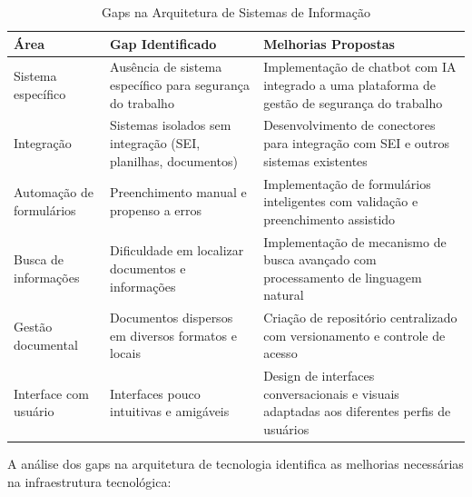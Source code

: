 \documentclass[12pt,a4paper]{article}
\begin{document}
\begin{table}[h]
\centering
\begin{tcolorbox}[enhanced, colback=white, colframe=gray!40, arc=3mm, boxrule=0.5pt]
\scriptsize
\begin{tabular}{|p{2.5cm}|p{4cm}|p{5cm}|}
\hline
\rowcolor{gray!20}
\textbf{Área} & \textbf{Gap Identificado} & \textbf{Melhorias Propostas} \\
\hline
Sistema específico & Ausência de sistema específico para segurança do trabalho & Implementação de chatbot com IA integrado a uma plataforma de gestão de segurança do trabalho \\
\hline
Integração & Sistemas isolados sem integração (SEI, planilhas, documentos) & Desenvolvimento de conectores para integração com SEI e outros sistemas existentes \\
\hline
Automação de formulários & Preenchimento manual e propenso a erros & Implementação de formulários inteligentes com validação e preenchimento assistido \\
\hline
Busca de informações & Dificuldade em localizar documentos e informações & Implementação de mecanismo de busca avançado com processamento de linguagem natural \\
\hline
Gestão documental & Documentos dispersos em diversos formatos e locais & Criação de repositório centralizado com versionamento e controle de acesso \\
\hline
Interface com usuário & Interfaces pouco intuitivas e amigáveis & Design de interfaces conversacionais e visuais adaptadas aos diferentes perfis de usuários \\
\hline
\end{tabular}
\end{tcolorbox}
\caption{Gaps na Arquitetura de Sistemas de Informação}
\end{table}

A análise dos gaps na arquitetura de tecnologia identifica as melhorias necessárias na infraestrutura tecnológica:
\end{document}
